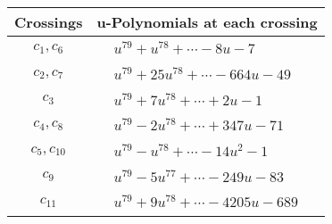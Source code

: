 \documentclass[1p]{elsarticle_modified}
\theoremstyle{definition}
\begin{document}
\begin{tabular}{m{50pt}|m{274pt}}
Crossings & \hspace{64pt}u-Polynomials at each crossing \\
\hline $$\begin{aligned}c_{1},c_{6}\end{aligned}$$&$\begin{aligned}
&u^{79}+u^{78}+\cdots-8 u-7
\end{aligned}$\\
\hline $$\begin{aligned}c_{2},c_{7}\end{aligned}$$&$\begin{aligned}
&u^{79}+25 u^{78}+\cdots-664 u-49
\end{aligned}$\\
\hline $$\begin{aligned}c_{3}\end{aligned}$$&$\begin{aligned}
&u^{79}+7 u^{78}+\cdots+2 u-1
\end{aligned}$\\
\hline $$\begin{aligned}c_{4},c_{8}\end{aligned}$$&$\begin{aligned}
&u^{79}-2 u^{78}+\cdots+347 u-71
\end{aligned}$\\
\hline $$\begin{aligned}c_{5},c_{10}\end{aligned}$$&$\begin{aligned}
&u^{79}- u^{78}+\cdots-14 u^2-1
\end{aligned}$\\
\hline $$\begin{aligned}c_{9}\end{aligned}$$&$\begin{aligned}
&u^{79}-5 u^{77}+\cdots-249 u-83
\end{aligned}$\\
\hline $$\begin{aligned}c_{11}\end{aligned}$$&$\begin{aligned}
&u^{79}+9 u^{78}+\cdots-4205 u-689
\end{aligned}$\\
\hline
\end{tabular}\\~\\
\newpage\renewcommand{\arraystretch}{1}
\end{document}
